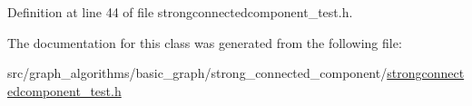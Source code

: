 Definition at line 44 of file strongconnectedcomponent\+\_\+test.\+h.



The documentation for this class was generated from the following file\+:\begin{DoxyCompactItemize}
\item 
src/graph\+\_\+algorithms/basic\+\_\+graph/strong\+\_\+connected\+\_\+component/\hyperlink{strongconnectedcomponent__test_8h}{strongconnectedcomponent\+\_\+test.\+h}\end{DoxyCompactItemize}
